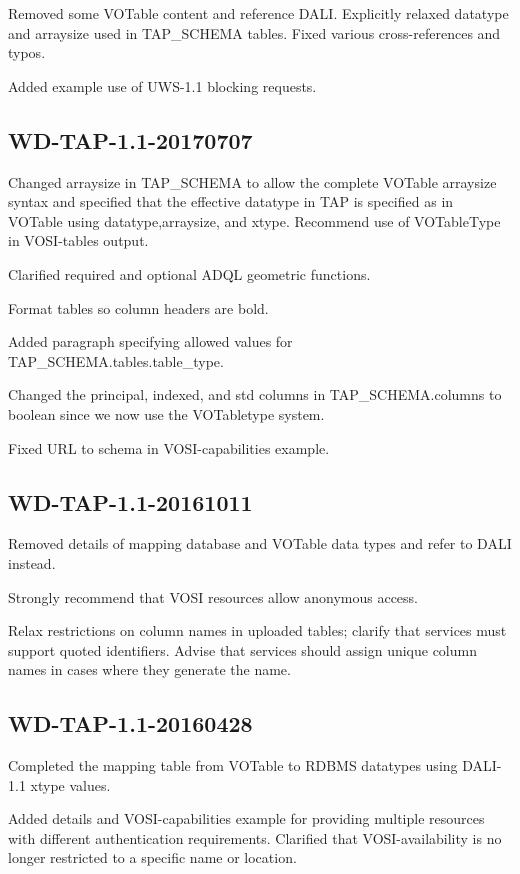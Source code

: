 \documentclass[11pt,letter]{ivoa}
\newcommand{\tapschema}{TAP\_SCHEMA}
\newcommand{\tapschema}{{%
  \relsize{-0.5}TAP\discretionary{-}{}{\kern-2pt\_}SCHEMA}}
\begin{document}
Removed some VOTable content and reference DALI. Explicitly relaxed datatype and arraysize used in \tapschema{} tables. Fixed various cross-references and typos. 

Added example use of UWS-1.1 blocking requests.

\subsection{WD-TAP-1.1-20170707}

Changed arraysize in \tapschema{} to allow the complete VOTable arraysize syntax and specified that the effective datatype in TAP is specified as in VOTable using datatype,arraysize, and xtype. Recommend use of VOTableType in VOSI-tables output.

Clarified required and optional ADQL geometric functions.

Format tables so column headers are bold.

Added paragraph specifying allowed values for \tapschema.tables.table\_type.

Changed the principal, indexed, and std columns in \tapschema.columns to boolean since we
now use the VOTabletype system.

Fixed URL to schema in VOSI-capabilities example.

\subsection{WD-TAP-1.1-20161011}

Removed details of mapping database and VOTable data types and refer to DALI 
instead. 

Strongly recommend that VOSI resources allow anonymous access.

Relax restrictions on column names in uploaded tables; clarify that services 
must support quoted identifiers. Advise that services should assign unique 
column names in cases where they generate the name.

\subsection{WD-TAP-1.1-20160428}

Completed the mapping table from VOTable to RDBMS datatypes using DALI-1.1 xtype values.

Added details and VOSI-capabilities example for providing multiple resources with different 
authentication requirements. Clarified that VOSI-availability is no longer restricted to a
specific name or location.
\end{document}
